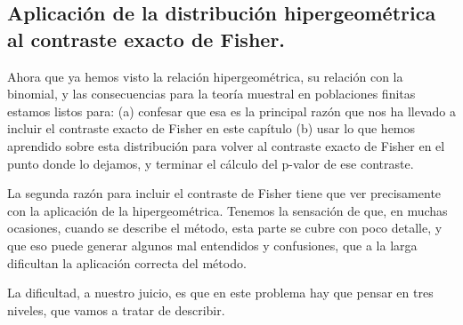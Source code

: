 \subsection{Aplicación de la distribución hipergeométrica al contraste exacto de Fisher.}
\label{cap12:subsec:RelacionHipergeometricaTablasContingencia}

Ahora que ya hemos visto la relación hipergeométrica, su relación con la binomial, y las consecuencias para la teoría muestral en poblaciones finitas estamos listos para: (a) confesar que esa es la principal razón que nos ha llevado a incluir el contraste exacto de Fisher en este capítulo (b) usar lo que hemos aprendido sobre esta distribución para volver al contraste exacto de Fisher en el punto donde lo dejamos, y terminar el cálculo del p-valor  de ese contraste.

La segunda razón para incluir el contraste de Fisher tiene que ver precisamente con la aplicación de la hipergeométrica. Tenemos la sensación de que, en muchas ocasiones, cuando se describe el método, esta parte se cubre con poco detalle, y que eso puede generar algunos mal entendidos y confusiones, que a la larga dificultan la aplicación correcta del método.

La dificultad, a nuestro juicio, es que en este problema hay que pensar en tres niveles, que vamos a tratar de describir.

